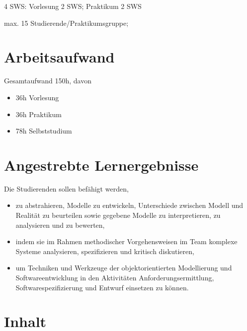4 SWS: Vorlesung 2 SWS; Praktikum 2 SWS

max. 15 Studierende/Praktikumsgruppe;

\hypertarget{arbeitsaufwandpathlabel....srcmodulbeschreibungen-bachelor-bpo5ba_softwaretechnik}{%
\section*{Arbeitsaufwand\label{../../src/modulbeschreibungen-bachelor-bpo5/BA_Softwaretechnik}}\label{arbeitsaufwandpathlabel....srcmodulbeschreibungen-bachelor-bpo5ba_softwaretechnik}}

Gesamtaufwand 150h, davon

\begin{itemize}
\tightlist
\item
  36h Vorlesung
\item
  36h Praktikum
\item
  78h Selbststudium
\end{itemize}

\hypertarget{angestrebte-lernergebnissepathlabel....srcmodulbeschreibungen-bachelor-bpo5ba_softwaretechnik}{%
\section*{Angestrebte
Lernergebnisse\label{../../src/modulbeschreibungen-bachelor-bpo5/BA_Softwaretechnik}}\label{angestrebte-lernergebnissepathlabel....srcmodulbeschreibungen-bachelor-bpo5ba_softwaretechnik}}

Die Studierenden sollen befähigt werden,

\begin{itemize}
\tightlist
\item
  zu abstrahieren, Modelle zu entwickeln, Unterschiede zwischen Modell
  und Realität zu beurteilen sowie gegebene Modelle zu interpretieren,
  zu analysieren und zu bewerten,
\item
  indem sie im Rahmen methodischer Vorgehensweisen im Team komplexe
  Systeme analysieren, spezifizieren und kritisch diskutieren,
\item
  um Techniken und Werkzeuge der objektorientierten Modellierung und
  Softwareentwicklung in den Aktivitäten Anforderungsermittlung,
  Softwarespezifizierung und Entwurf einsetzen zu können.
\end{itemize}

\hypertarget{inhaltpathlabel....srcmodulbeschreibungen-bachelor-bpo5ba_softwaretechnik}{%
\section*{Inhalt\label{../../src/modulbeschreibungen-bachelor-bpo5/BA_Softwaretechnik}}\label{inhaltpathlabel....srcmodulbeschreibungen-bachelor-bpo5ba_softwaretechnik}}

